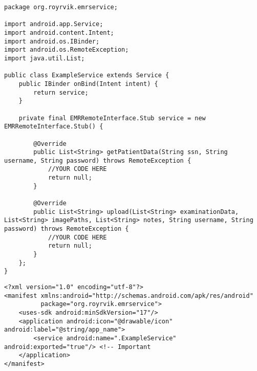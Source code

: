\begin{lstlisting}[caption={ExampleService.java}, label={lst:exampleservice}]
package org.royrvik.emrservice;

import android.app.Service;
import android.content.Intent;
import android.os.IBinder;
import android.os.RemoteException;
import java.util.List;

public class ExampleService extends Service {
    public IBinder onBind(Intent intent) {
        return service;
    }

    private final EMRRemoteInterface.Stub service = new EMRRemoteInterface.Stub() {

        @Override
        public List<String> getPatientData(String ssn, String username, String password) throws RemoteException {
            //YOUR CODE HERE
            return null;
        }

        @Override
        public List<String> upload(List<String> examinationData, List<String> imagePaths, List<String> notes, String username, String password) throws RemoteException {
            //YOUR CODE HERE
            return null;
        }
    };
}
\end{lstlisting}



\newpage

\lstset{language=XML}
\begin{lstlisting}[caption={AndroidManifest.xml}, label={lst:manifest}]
<?xml version="1.0" encoding="utf-8"?>
<manifest xmlns:android="http://schemas.android.com/apk/res/android"
          package="org.royrvik.emrservice">
    <uses-sdk android:minSdkVersion="17"/>
    <application android:icon="@drawable/icon" android:label="@string/app_name">
        <service android:name=".ExampleService" android:exported="true"/> <!-- Important
    </application>
</manifest>
\end{lstlisting}

\newpage


